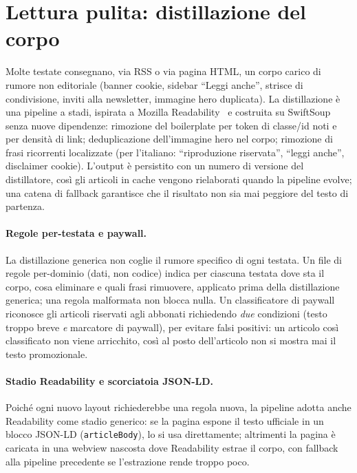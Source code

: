 \section{Lettura pulita: distillazione del corpo}
\label{sec:distillation}
Molte testate consegnano, via RSS o via pagina HTML, un corpo carico di
rumore non editoriale (banner cookie, sidebar ``Leggi anche'', strisce di
condivisione, inviti alla newsletter, immagine hero duplicata). La
distillazione è una pipeline a stadi, ispirata a Mozilla
Readability~\cite{mozilla-readability} e costruita su SwiftSoup senza
nuove dipendenze: rimozione del boilerplate per token di classe/id noti
e per densità di link; deduplicazione dell'immagine hero nel corpo;
rimozione di frasi ricorrenti localizzate (per l'italiano: ``riproduzione
riservata'', ``leggi anche'', disclaimer cookie). L'output è persistito
con un numero di versione del distillatore, così gli articoli in cache
vengono rielaborati quando la pipeline evolve; una catena di fallback
garantisce che il risultato non sia mai peggiore del testo di partenza.

\paragraph{Regole per-testata e paywall.}
\label{sec:outlet-rules-audit}
La distillazione generica non coglie il rumore specifico di ogni
testata. Un file di regole per-dominio (dati, non codice) indica per
ciascuna testata dove sta il corpo, cosa eliminare e quali frasi
rimuovere, applicato prima della distillazione generica; una regola
malformata non blocca nulla. Un classificatore di paywall riconosce gli
articoli riservati agli abbonati richiedendo \emph{due} condizioni
(testo troppo breve \emph{e} marcatore di paywall), per evitare falsi
positivi: un articolo così classificato non viene arricchito, così al
posto dell'articolo non si mostra mai il testo promozionale.

\paragraph{Stadio Readability e scorciatoia JSON-LD.}
\label{sec:readability-stage}
Poiché ogni nuovo layout richiederebbe una regola nuova, la pipeline
adotta anche Readability come stadio generico: se la pagina espone il
testo ufficiale in un blocco JSON-LD (\texttt{articleBody}), lo si usa
direttamente; altrimenti la pagina è caricata in una webview nascosta
dove Readability estrae il corpo, con fallback alla pipeline precedente
se l'estrazione rende troppo poco.

